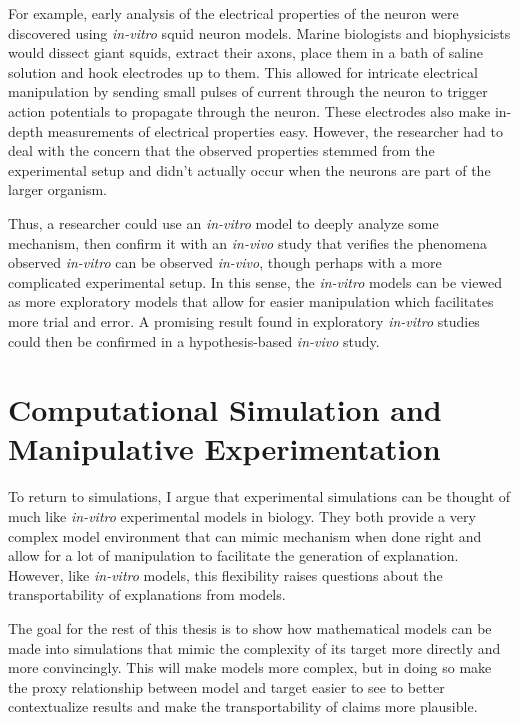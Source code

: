 For example, early analysis of the electrical properties of the neuron
were discovered using \emph{in-vitro} squid neuron models. Marine
biologists and biophysicists would dissect giant squids, extract their
axons, place them in a bath of saline solution and hook electrodes up to
them. This allowed for intricate electrical manipulation by sending
small pulses of current through the neuron to trigger action potentials
to propagate through the neuron. These electrodes also make in-depth
measurements of electrical properties easy. However, the researcher had
to deal with the concern that the observed properties stemmed from the
experimental setup and didn't actually occur when the neurons are part
of the larger organism.

Thus, a researcher could use an \emph{in-vitro} model to deeply analyze
some mechanism, then confirm it with an \emph{in-vivo} study that
verifies the phenomena observed \emph{in-vitro} can be observed
\emph{in-vivo}, though perhaps with a more complicated experimental
setup. In this sense, the \emph{in-vitro} models can be viewed as more
exploratory models that allow for easier manipulation which facilitates
more trial and error. A promising result found in exploratory
\emph{in-vitro} studies could then be confirmed in a hypothesis-based
\emph{in-vivo} study.

\hypertarget{computational-simulation-and-manipulative-experimentation}{%
\section{Computational Simulation and Manipulative
Experimentation}\label{computational-simulation-and-manipulative-experimentation}}

To return to simulations, I argue that experimental simulations can be
thought of much like \emph{in-vitro} experimental models in biology.
They both provide a very complex model environment that can mimic
mechanism when done right and allow for a lot of manipulation to
facilitate the generation of explanation. However, like \emph{in-vitro}
models, this flexibility raises questions about the transportability of
explanations from models.

The goal for the rest of this thesis is to show how mathematical models
can be made into simulations that mimic the complexity of its target
more directly and more convincingly. This will make models more complex,
but in doing so make the proxy relationship between model and target
easier to see to better contextualize results and make the
transportability of claims more plausible.
